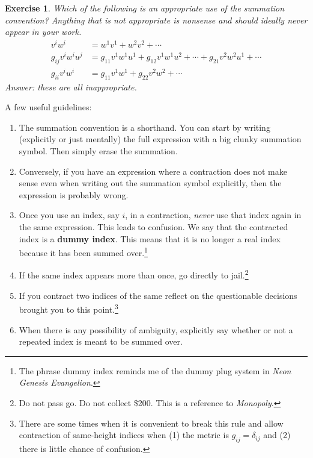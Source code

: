 \documentclass[
  11pt,
	colorful,
	raggedright,
]{tufte-style-thesis-flip}
\newtheorem{exercise}{Exercise}[section]
\begin{document}
\begin{exercise}
Which of the following is an appropriate use of the summation convention? Anything that is not appropriate is nonsense and should ideally never appear in your work.
\begin{align}
  v^i w^i &= w^1 v^1 + w^2 v^2 + \cdots
  \\
  g_{ij}v^iw^i u^j &= g_{11}v^1w^1u^1 + g_{12}v^1w^1u^2 + \cdots  + g_{21}v^2w^2u^1 + \cdots \\
  g_{ii}v^iw^i &= g_{11}v^1w^1 + g_{22}v^2w^2 + \cdots 
\end{align}
Answer: these are all inappropriate. 
\end{exercise}

A few useful guidelines:
\begin{enumerate}
  \item The summation convention is a shorthand. You can start by writing (explicitly or just mentally) the full expression with a big clunky summation symbol. Then simply erase the summation. 
  \item Conversely, if you have an expression where a contraction does not make sense even when writing out the summation symbol explicitly, then the expression is probably wrong.
  \item Once you use an index, say $i$, in a contraction, \emph{never} use that index again in the same expression. This leads to confusion. We say that the contracted index is a \textbf{dummy index}. This means that it is no longer a real index because it has been summed over.\footnote{The phrase dummy index reminds me of the dummy plug system in \emph{Neon Genesis Evangelion}.}
  \item If the same index appears more than once, go directly to jail.\footnote{Do not pass go. Do not collect \$200. This is a reference to \emph{Monopoly}.}
  \item If you contract two indices of the same reflect on the questionable decisions brought you to this point.\footnote{There are some times when it is convenient to break this rule and allow contraction of same-height indices when (1) the metric is $g_{ij}=\delta_{ij}$ and (2) there is little chance of confusion.}
  \item When there is any possibility of ambiguity, explicitly say whether or not a repeated index is meant to be summed over.  
\end{enumerate}
\end{document}
